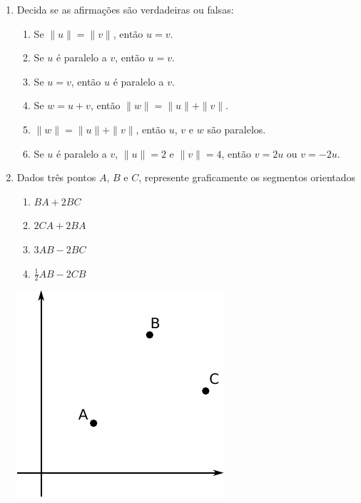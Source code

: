 \documentclass[a4paper,5pt]{amsbook}
\newcommand{\ds}{\displaystyle}
\begin{document}
\begin{enumerate}
	\vspace{0.3cm}
	\item Decida se as afirma\c{c}\~oes s\~ao verdadeiras ou falsas:
	\begin{enumerate}
		\item Se $\|u\| = \|v\|$, ent\~ao $u = v$.
		\item Se $u$ \'e paralelo a $v$, ent\~ao $u = v$.
		\item Se $u = v$, ent\~ao $u$ \'e paralelo a $v$.
		\item Se $w = u + v$, ent\~ao $\|w\| = \|u\| + \|v\|$.
		\item $\|w\| = \|u\| + \|v\|$, ent\~ao $u$, $v$ e $w$ s\~ao paralelos.
		\item Se $u$ \'e paralelo a $v$, $\|u\| = 2$ e $\|v\| = 4$, ent\~ao $v = 2u$ ou $v = -2u$.
	\end{enumerate}

	\vspace{0.3cm}
	\item Dados tr\^es pontos $A$, $B$ e $C$, represente graficamente os
		segmentos orientados

	\begin{minipage}{0.4\textwidth}
		\begin{enumerate}
			\item $BA + 2 BC$
			\vspace{0.2cm}
			\item $2 CA + 2 BA$
			\vspace{0.2cm}
			\item $3 AB - 2 BC$
			\vspace{0.2cm}
			\item $\ds\frac{1}{2} AB - 2 CB$
		\end{enumerate}
	\end{minipage}
	\begin{minipage}{0.4\textwidth}
		\includegraphics[scale=0.6]{fig/lista7_2.pdf}
	\end{minipage}


\end{enumerate}
\end{document}
